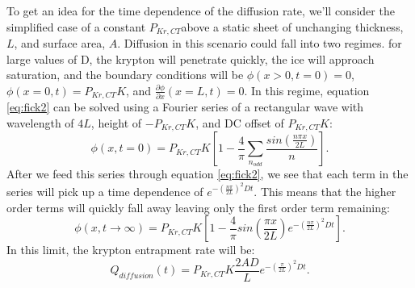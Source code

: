 \documentclass[12pt]{article}
\begin{document}
To get an idea for the time dependence of the diffusion rate, we'll consider the simplified case of a constant $P_{Kr,CT}$above a static sheet of unchanging thickness, $L$, and surface area, $A$. Diffusion in this scenario could fall into two regimes. for large values of D, the krypton will penetrate quickly, the ice will approach saturation, and the boundary conditions will be $\phi(x>0,t=0)=0$, $\phi(x=0,t)=P_{Kr,CT}K$, and $\frac{\partial \phi}{\partial x} (x=L,t)=0$. In this regime, equation \ref{eq:fick2} can be solved using a Fourier series of a rectangular wave with wavelength of $4L$, height of $-P_{Kr,CT}K$, and DC offset of $P_{Kr,CT}K$:
\begin{equation}
\phi(x,t=0)=P_{Kr,CT}K[1-\frac{4}{\pi}\sum_{n_{odd}}\frac{sin(\frac{n\pi x}{2L})}{n}].
\end{equation}
After we feed this series through equation \ref{eq:fick2}, we see that each term in the series will pick up a time dependence of $e^{-(\frac{n\pi }{2L})^2D t}$. This means that the higher order terms will quickly fall away leaving only the first order term remaining:
\begin{equation}
\phi(x,t \rightarrow \infty)=P_{Kr,CT}K[1-\frac{4}{\pi}sin(\frac{\pi x}{2L})e^{-(\frac{n\pi }{2L})^2D t}].
\end{equation}
In this limit, the krypton entrapment rate will be:
\begin{equation}
Q_{diffusion}(t)=P_{Kr,CT}K\frac{2AD}{L}e^{-(\frac{\pi }{2L})^2D t}.
\end{equation}
\end{document}
